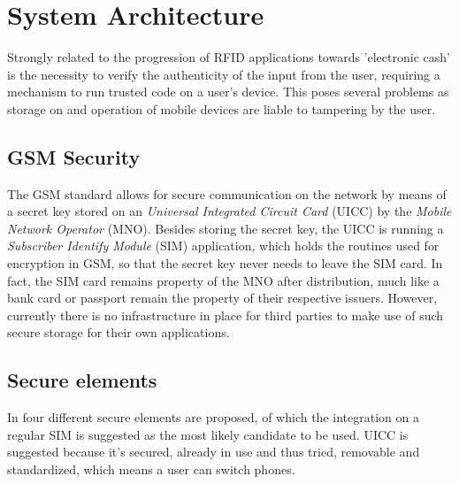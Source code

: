 \section{System Architecture}
\label{chap:hardware_architecture}
Strongly related to the progression of RFID applications towards 'electronic cash' is the necessity to verify the authenticity of the input from the user, requiring a mechanism to run trusted code on a user's device.
This poses several problems as storage on and operation of mobile devices are liable to tampering by the user.

\subsection{GSM Security}
The GSM standard allows for secure communication on the network by means of a secret key stored on an \textit{Universal Integrated Circuit Card} (UICC) by the \textit{Mobile Network Operator} (MNO).
Besides storing the secret key, the UICC is running a \textit{Subscriber Identify Module} (SIM) application, which holds the routines used for encryption in GSM, so that the secret key never needs to leave the SIM card.
In fact, the SIM card remains property of the MNO after distribution, much like a bank card or passport remain the property of their respective issuers.
However, currently there is no infrastructure in place for third parties to make use of such secure storage for their own applications.





\subsection{Secure elements}
In \cite{Reveilhac:2009:PSE:1548884.1549404} four different secure elements are proposed, of which the integration on a regular SIM is suggested as the most likely candidate to be used.
UICC is suggested because it's secured, already in use and thus tried, removable and standardized, which means a user can switch phones. 



